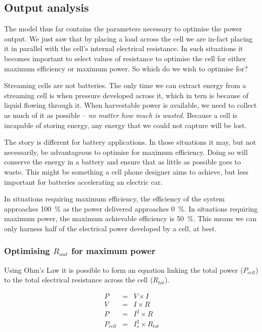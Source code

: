 \subsection{Output analysis}

The model thus far contains the parameters necessary to optimise the power output.
We just saw that by placing a load across the cell we are in-fact placing it in parallel with the cell's internal electrical resistance.
In such situations it becomes important to select values of resistance to optimise the cell for either maximum efficiency or maximum power.
So which do we wish to optimise for?

Streaming cells are not batteries.
The only time we can extract energy from a streaming cell is when pressure developed across it, which in tern is because of liquid flowing through it.
When harvestable power is available, we need to collect as much of it as possible -- \emph{no matter how much is wasted}.
Because a cell is incapable of storing energy, any energy that we could not capture will be lost.

The story is different for battery applications.
In those situations it may, but not necessarily, be advantageous to optimise for maximum efficiency.
Doing so will conserve the energy in a battery and ensure that as little as possible goes to waste.
This might be something a cell phone designer aims to achieve, but less important for batteries accelerating an electric car.

In situations requiring maximum efficiency, the efficiency of the system approaches \SI{100}{\percent} as the power delivered approaches \SI{0}{\percent}.
In situations requiring maximum power, the maximum achievable efficiency is \SI{50}{\percent}.
This means we can only harness half of the electrical power developed by a cell, at best.

\subsubsection*{Optimising $R_{out}$ for maximum power}

Using Ohm's Law it is possible to form an equation linking the total power ($P_{cell}$) to the total electrical resistance across the cell ($R_{tot}$).

\begin{eqnarray}
    P & = & V\times I\nonumber \\
    V & = & I\times R\nonumber \\
    P & = & I^{2}\times R\nonumber \\
    P_{cell} & = & I_{s}^{2}\times R_{tot}
    \label{eq:DeterminingOutputPower_basic}
\end{eqnarray}

